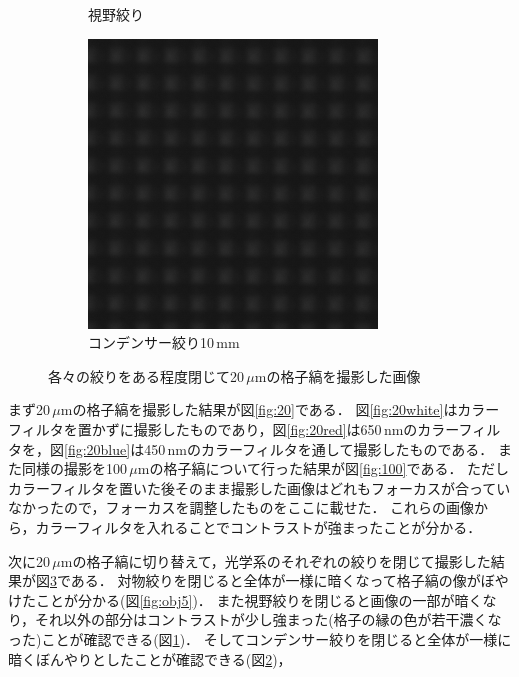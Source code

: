 \documentclass[titlepage]{jsarticle}
\begin{document}
\begin{figure}[htbp]
\begin{subfigure}{0.3\columnwidth}
        \caption{視野絞り}
        \label{fig:shiya}
    \end{subfigure}
    \begin{subfigure}{0.3\columnwidth}
        \centering
        \includegraphics[width=\columnwidth]{20um_blue_condensor10mm_tri.png}
        \caption{コンデンサー絞り10\,mm}
        \label{fig:cond10}
    \end{subfigure}    
    \caption{各々の絞りをある程度閉じて20\,$\mu$mの格子縞を撮影した画像}
    \label{fig:20_sibori}
\end{figure}


まず20\,$\mu$mの格子縞を撮影した結果が図\ref{fig:20}である．
図\ref{fig:20white}はカラーフィルタを置かずに撮影したものであり，図\ref{fig:20red}は650\,nmのカラーフィルタを，図\ref{fig:20blue}は450\,nmのカラーフィルタを通して撮影したものである．
また同様の撮影を100\,$\mu$mの格子縞について行った結果が図\ref{fig:100}である．
ただしカラーフィルタを置いた後そのまま撮影した画像はどれもフォーカスが合っていなかったので，フォーカスを調整したものをここに載せた．
これらの画像から，カラーフィルタを入れることでコントラストが強まったことが分かる．

次に20\,$\mu$mの格子縞に切り替えて，光学系のそれぞれの絞りを閉じて撮影した結果が図\ref{fig:20_sibori}である．
対物絞りを閉じると全体が一様に暗くなって格子縞の像がぼやけたことが分かる(図\ref{fig:obj5})．
また視野絞りを閉じると画像の一部が暗くなり，それ以外の部分はコントラストが少し強まった(格子の縁の色が若干濃くなった)ことが確認できる(図\ref{fig:shiya})．
そしてコンデンサー絞りを閉じると全体が一様に暗くぼんやりとしたことが確認できる(図\ref{fig:cond10})，
\end{document}
